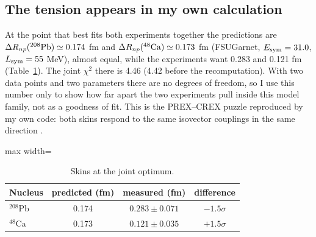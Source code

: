 \documentclass[11pt,a4paper]{article}
\newcommand{\Esym}{E_{\rm sym}}
\newcommand{\Lsym}{L_{\rm sym}}
\newcommand{\DRnp}{\Delta R_{np}}
\begin{document}
\subsection{The tension appears in my own calculation}
At the point that best fits both experiments together the predictions are $\DRnp(^{208}{\rm Pb})\simeq0.174$ fm and $\DRnp(^{48}{\rm Ca})\simeq0.173$ fm (FSUGarnet, $\Esym=31.0$, $\Lsym=55$ MeV), almost equal, while the experiments want 0.283 and 0.121 fm (Table~\ref{tab:pred}). The joint $\chi^2$ there is 4.46 (4.42 before the recomputation). With two data points and two parameters there are no degrees of freedom, so I use this number only to show how far apart the two experiments pull inside this model family, not as a goodness of fit. This is the PREX--CREX puzzle \cite{Reinhard2022} reproduced by my own code: both skins respond to the same isovector couplings in the same direction \cite{Furnstahl2002}.

\begin{table}[h]
\centering
\caption{Skins at the joint optimum.}\label{tab:pred}
\begin{adjustbox}{max width=\linewidth}
\begin{tabular}{lccc}
\toprule
Nucleus & predicted (fm) & measured (fm) & difference\\
\midrule
$^{208}$Pb & 0.174 & $0.283\pm0.071$ \cite{PREX2} & $-1.5\sigma$\\
$^{48}$Ca & 0.173 & $0.121\pm0.035$ \cite{CREX} & $+1.5\sigma$\\
\bottomrule
\end{tabular}
\end{adjustbox}
\end{table}
\end{document}
